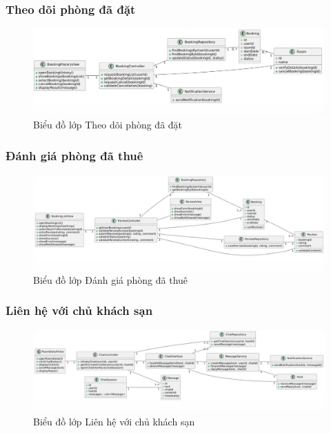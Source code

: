 \subsubsection{Theo dõi phòng đã đặt}
\begin{figure}[H]
    \centering
    \includegraphics[width=\textwidth]{img3.4.2/xemphongthue4.jpg} 
    \caption{Biểu đồ lớp Theo dõi phòng đã đặt}
\end{figure}


\subsubsection{Đánh giá phòng đã thuê}
\begin{figure}[H]
    \centering
    \includegraphics[width=\textwidth]{img3.4.2/dgia4.jpg} 
    \caption{Biểu đồ lớp Đánh giá phòng đã thuê}
\end{figure}


\subsubsection{Liên hệ với chủ khách sạn}
\begin{figure}[H]
    \centering
    \includegraphics[width=\textwidth]{img3.4.2/chat4.jpg} 
    \caption{Biểu đồ lớp Liên hệ với chủ khách sạn}
\end{figure}

